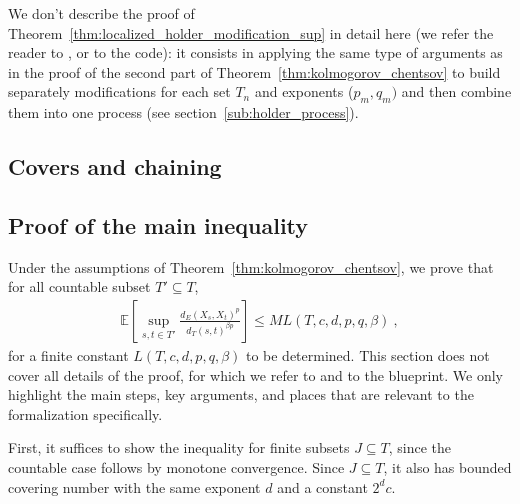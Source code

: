 \documentclass[lean]{Draft}
\begin{document}
We don't describe the proof of Theorem~\ref{thm:localized_holder_modification_sup} in detail here (we refer the reader to \cite{kratschmer2023kolmogorov}, or to the code): it consists in applying the same type of arguments as in the proof of the second part of Theorem~\ref{thm:kolmogorov_chentsov} to build separately modifications for each set $T_n$ and exponents ($p_m, q_m)$ and then combine them into one process (see section~\ref{sub:holder_process}).



\subsection{Covers and chaining}



\subsection{Proof of the main inequality}

Under the assumptions of Theorem~\ref{thm:kolmogorov_chentsov}, we prove that for all countable subset $T' \subseteq T$,
\begin{align*}
  \mathbb{E}\left[ \sup_{s, t \in T'} \frac{d_E(X_s, X_t)^p}{d_T(s, t)^{\beta p}} \right]
  \le M L(T, c, d, p, q, \beta)
  \: ,
\end{align*}
for a finite constant $L(T, c, d, p, q, \beta)$ to be determined.
This section does not cover all details of the proof, for which we refer to \cite{kratschmer2023kolmogorov} and to the blueprint. We only highlight the main steps, key arguments, and places that are relevant to the formalization specifically.

First, it suffices to show the inequality for finite subsets $J \subseteq T$, since the countable case follows by monotone convergence.
Since $J \subseteq T$, it also has bounded covering number with the same exponent $d$ and a constant $2^d c$.
\end{document}
